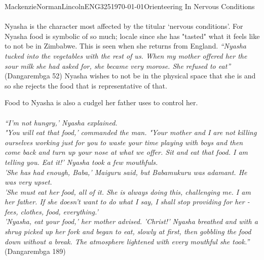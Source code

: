 \documentclass{article}
\begin{document}
\begin{mla}{Mackenzie}{Norman}{Lincoln}{ENG325}{\today}{Orienteering In Nervous Conditions}
\paragraph{}

Nyasha is the character most affected by the titular `nervous conditions'. For Nyasha food is symbolic of so much; locale since she has "tasted" what it feels like to not be in Zimbabwe. This is seen when she returns from England. \textit{``Nyasha tucked into the vegetables with the rest of us. When my mother offered her the sour milk she had asked for, she became very morose. She refused to eat'' }(Dangarembga 52) Nyasha wishes to not be in the physical space that she is and so she rejects the food that is representative of that. 

Food to Nyasha is also a cudgel her father uses to control her. 
\paragraph{}
\textit{``I'm not hungry,' Nyasha explained.}\\

\textit{"You will eat that food,' commanded the man. "Your mother and I are not killing ourselves working just for you to waste your time playing with boys and then come back and turn up your nose at what we offer. Sit and eat that food. I am telling you. Eat it!' Nyasha took a few mouthfuls.}\\

\textit{'She has had enough, Baba,' Maiguru said, but Babamukuru was adamant. He was very upset.}\\

\textit{'She must eat her food, all of it. She is always doing this, challenging me. I am her father. If she doesn't want to do what I say, I shall stop providing for her - fees, clothes, food, everything.'}\\


\textit{'Nyasha, eat your food,' her mother advised.}
\textit{'Christ!' Nyasha breathed and with a shrug picked up her fork and began to eat, slowly at first, then gobbling the food down without a break. The atmosphere lightened with every mouthful she took.''} (Dangarembga 189)
\paragraph{}


\end{mla}
\end{document}
